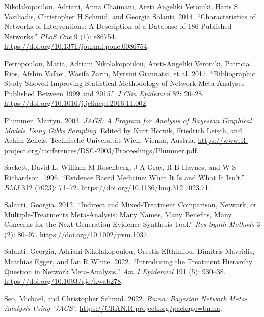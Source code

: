 \begin{CSLReferences}{1}{0}
\leavevmode{}%
Nikolakopoulou, Adriani, Anna Chaimani, Areti Angeliki Veroniki, Haris S Vasiliadis, Christopher H Schmid, and Georgia Salanti. 2014. {``Characteristics of Networks of Interventions: A Description of a Database of 186 Published Networks.''} \emph{PLoS One} 9 (1): e86754. \url{https://doi.org/10.1371/journal.pone.0086754}.

\leavevmode{}%
Petropoulou, Maria, Adriani Nikolakopoulou, Areti-Angeliki Veroniki, Patricia Rios, Afshin Vafaei, Wasifa Zarin, Myrsini Giannatsi, et al. 2017. {``Bibliographic Study Showed Improving Statistical Methodology of Network Meta-Analyses Published Between 1999 and 2015.''} \emph{J Clin Epidemiol} 82: 20--28. \url{https://doi.org/10.1016/j.jclinepi.2016.11.002}.

\leavevmode{}%
Plummer, Martyn. 2003. \emph{JAGS: A Program for Analysis of Bayesian Graphical Models Using Gibbs Sampling}. Edited by Kurt Hornik, Friedrich Leisch, and Achim Zeileis. Technische Universität Wien, Vienna, Austria. \url{https://www.R-project.org/conferences/DSC-2003/Proceedings/Plummer.pdf}.

\leavevmode{}%
Sackett, David L, William M Rosenberg, J A Gray, R B Haynes, and W S Richardson. 1996. {``Evidence Based Medicine: What It Is and What It Isn't.''} \emph{BMJ} 312 (7023): 71--72. \url{https://doi.org/10.1136/bmj.312.7023.71}.

\leavevmode{}%
Salanti, Georgia. 2012. {``Indirect and Mixed-Treatment Comparison, Network, or Multiple-Treatments Meta-Analysis: Many Names, Many Benefits, Many Concerns for the Next Generation Evidence Synthesis Tool.''} \emph{Res Synth Methods} 3 (2): 80--97. \url{https://doi.org/10.1002/jrsm.1037}.

\leavevmode{}%
Salanti, Georgia, Adriani Nikolakopoulou, Orestis Efthimiou, Dimitris Mavridis, Matthias Egger, and Ian R White. 2022. {``Introducing the Treatment Hierarchy Question in Network Meta-Analysis.''} \emph{Am J Epidemiol} 191 (5): 930--38. \url{https://doi.org/10.1093/aje/kwab278}.

\leavevmode{}%
Seo, Michael, and Christopher Schmid. 2022. \emph{Bnma: Bayesian Network Meta-Analysis Using 'JAGS'}. \url{https://CRAN.R-project.org/package=bnma}.


\end{CSLReferences}
